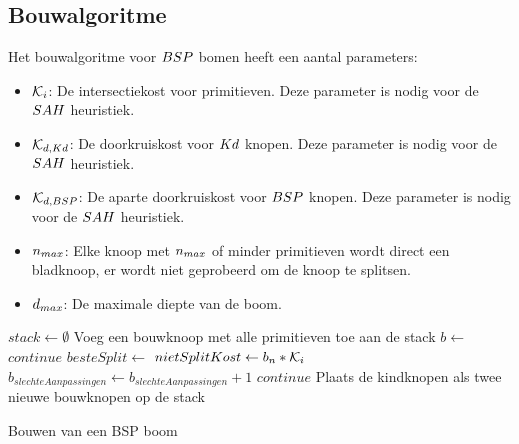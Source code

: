 \subsection{Bouwalgoritme}
Het bouwalgoritme voor $BSP$ bomen heeft een aantal parameters:
\begin{itemize}
    \item $\mathcal{K}_i$: De intersectiekost voor primitieven. Deze parameter is nodig voor de $SAH$ heuristiek.
    \item $\mathcal{K}_{d,Kd}$: De doorkruiskost voor $Kd$ knopen. Deze parameter is nodig voor de $SAH$ heuristiek.
    \item $\mathcal{K}_{d,BSP}$: De aparte doorkruiskost voor $BSP$ knopen. Deze parameter is nodig voor de $SAH$ heuristiek.
    \item $n_{max}$: Elke knoop met $n_{max}$ of minder primitieven wordt direct een bladknoop, er wordt niet geprobeerd om de knoop te splitsen.
    \item $d_{max}$: De maximale diepte van de boom.
\end{itemize}
\begin{dutchalgorithm}
    \begin{algorithmic}
        \State $stack\gets \emptyset$
        \State Voeg een bouwknoop met alle primitieven toe aan de stack
            \State $b \gets $
                \State {}
                \State $continue$
            \EndIf
            \State $besteSplit \gets $ 
            \State $nietSplitKost \gets  b_{n}*\mathcal{K}_i$
                \State $b_{slechteAanpassingen} \gets b_{slechteAanpassingen} + 1$
            \EndIf
                \State {}
                \State $continue$
            \EndIf
            \State {}
            \State Plaats de kindknopen als twee nieuwe bouwknopen op de stack
        \EndWhile
    \end{algorithmic}
    \caption{Bouwen van een BSP boom}
    \label{alg:bsp-bouw}
\end{dutchalgorithm}

